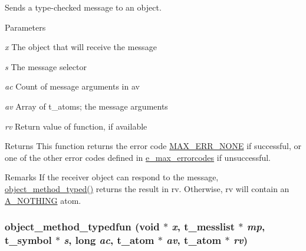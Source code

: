 Sends a type-\/checked message to an object. 
\begin{DoxyParams}{Parameters}
\item[{\em x}]The object that will receive the message \item[{\em s}]The message selector \item[{\em ac}]Count of message arguments in {\ttfamily av} \item[{\em av}]Array of t\_\-atoms; the message arguments \item[{\em rv}]Return value of function, if available\end{DoxyParams}
\begin{DoxyReturn}{Returns}
This function returns the error code \hyperlink{group__misc_gga0764dd6c02b76cca7d053ae50555d69da6d22f77fef8b1e1b074cef5d29d935fd}{MAX\_\-ERR\_\-NONE} if successful, or one of the other error codes defined in \hyperlink{group__misc_ga0764dd6c02b76cca7d053ae50555d69d}{e\_\-max\_\-errorcodes} if unsuccessful.
\end{DoxyReturn}
\begin{DoxyRemark}{Remarks}
If the receiver object can respond to the message, \hyperlink{group__obj_ga443dee482af22e0fe83e68955d367226}{object\_\-method\_\-typed()} returns the result in {\ttfamily rv}. Otherwise, {\ttfamily rv} will contain an \hyperlink{group__atom_gga8aa6700e9f00b132eb376db6e39ade47a858ddb5d5927eae3fd699a82c7e174b6}{A\_\-NOTHING} atom. 
\end{DoxyRemark}
\hypertarget{group__obj_gaa5ff59d2297a2dde60e3f2fe3e02eceb}{
\subsubsection[{object\_\-method\_\-typedfun}]{ object\_\-method\_\-typedfun (void $\ast$ {\em x}, \/  {\bf t\_\-messlist} $\ast$ {\em mp}, \/  {\bf t\_\-symbol} $\ast$ {\em s}, \/  long {\em ac}, \/  {\bf t\_\-atom} $\ast$ {\em av}, \/  {\bf t\_\-atom} $\ast$ {\em rv})}}
\label{group__obj_gaa5ff59d2297a2dde60e3f2fe3e02eceb}


